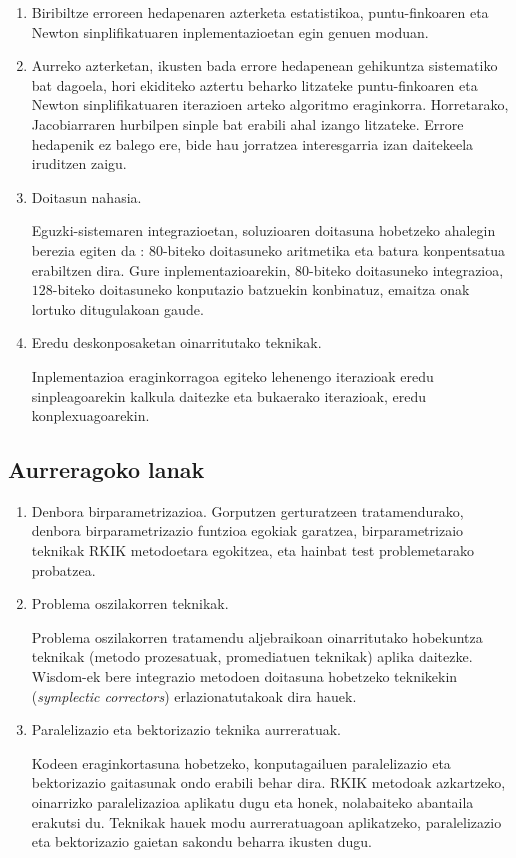 \begin{enumerate}
\item Biribiltze erroreen hedapenaren azterketa estatistikoa, puntu-finkoaren eta Newton sinplifikatuaren inplementazioetan egin genuen moduan.


\item Aurreko azterketan, ikusten bada errore hedapenean gehikuntza sistematiko bat dagoela, hori ekiditeko aztertu beharko litzateke puntu-finkoaren eta Newton sinplifikatuaren iterazioen arteko algoritmo eraginkorra. Horretarako,  Jacobiarraren hurbilpen sinple bat erabili ahal izango litzateke. Errore hedapenik ez balego ere, bide hau jorratzea interesgarria izan daitekeela iruditzen zaigu.

\item Doitasun nahasia.

Eguzki-sistemaren integrazioetan, soluzioaren doitasuna hobetzeko ahalegin berezia egiten da \cite{Laskar2015}: $80$-biteko doitasuneko aritmetika eta batura konpentsatua erabiltzen dira. Gure inplementazioarekin, $80$-biteko doitasuneko integrazioa, $128$-biteko doitasuneko konputazio batzuekin konbinatuz, emaitza onak lortuko ditugulakoan gaude.

\item Eredu deskonposaketan oinarritutako teknikak.

Inplementazioa eraginkorragoa egiteko lehenengo iterazioak eredu sinpleagoarekin kalkula daitezke eta bukaerako iterazioak, eredu konplexuagoarekin.

\end{enumerate}


\subsection*{Aurreragoko lanak}


\begin{enumerate}


\item Denbora birparametrizazioa.
Gorputzen gerturatzeen tratamendurako, denbora birparametrizazio funtzioa egokiak garatzea, birparametrizaio teknikak RKIK metodoetara egokitzea, eta hainbat test problemetarako probatzea.

\item Problema oszilakorren teknikak.

Problema oszilakorren tratamendu aljebraikoan oinarritutako hobekuntza teknikak (metodo prozesatuak, promediatuen teknikak) aplika daitezke.
Wisdom-ek \cite{Wisdom2006} bere integrazio metodoen doitasuna hobetzeko teknikekin (\emph{symplectic correctors}) erlazionatutakoak dira hauek.


\item Paralelizazio eta bektorizazio teknika aurreratuak.

Kodeen eraginkortasuna hobetzeko, konputagailuen paralelizazio eta bektorizazio gaitasunak ondo erabili behar dira. RKIK metodoak azkartzeko, oinarrizko paralelizazioa aplikatu dugu eta honek, nolabaiteko abantaila erakutsi du. Teknikak hauek modu aurreratuagoan aplikatzeko,  paralelizazio eta bektorizazio gaietan sakondu beharra ikusten dugu.


\end{enumerate}
